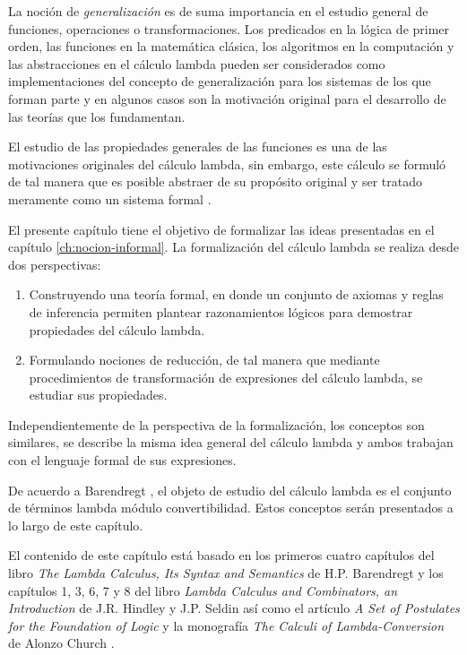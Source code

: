 La noción de \emph{generalización} es de suma importancia en el estudio general de funciones, operaciones o transformaciones. Los predicados en la lógica de primer orden, las funciones en la matemática clásica, los algoritmos en la computación y las abstracciones en el cálculo lambda pueden ser considerados como implementaciones del concepto de generalización para los sistemas de los que forman parte y en algunos casos son la motivación original para el desarrollo de las teorías que los fundamentan.

El estudio de las propiedades generales de las funciones es una de las motivaciones originales del cálculo lambda, sin embargo, este cálculo se formuló de tal manera que es posible abstraer de su propósito original y ser tratado meramente como un sistema formal \cite{Church:LambdaConversion}.

El presente capítulo tiene el objetivo de formalizar las ideas presentadas en el capítulo \ref{ch:nocion-informal}. La formalización del cálculo lambda se realiza desde dos perspectivas:

\begin{enumerate}
\item Construyendo una teoría formal, en donde un conjunto de axiomas y reglas de inferencia permiten plantear razonamientos lógicos para demostrar propiedades del cálculo lambda.
\item Formulando nociones de reducción, de tal manera que mediante procedimientos de transformación de expresiones del cálculo lambda, se estudiar sus propiedades.
\end{enumerate}

Independientemente de la perspectiva de la formalización, los conceptos son similares, se describe la misma idea general del cálculo lambda y ambos trabajan con el lenguaje formal de sus expresiones.

De acuerdo a Barendregt \cite[p.~22]{Barendregt:Bible}, el objeto de estudio del cálculo lambda es el conjunto de términos lambda módulo convertibilidad. Estos conceptos serán presentados a lo largo de este capítulo.

El contenido de este capítulo está basado en los primeros cuatro capítulos del libro \emph{The Lambda Calculus, Its Syntax and Semantics} de H.P. Barendregt \cite{Barendregt:Bible} y los capítulos 1, 3, 6, 7 y 8 del libro \emph{Lambda Calculus and Combinators, an Introduction} de J.R. Hindley y J.P. Seldin \cite{HindleySeldin:LambdaCalculusAndCombinators} así como el artículo \emph{A Set of Postulates for the Foundation of Logic} y la monografía \emph{The Calculi of Lambda-Conversion} de Alonzo Church \cite{Church:FoundationsLogic,Church:LambdaConversion}.

